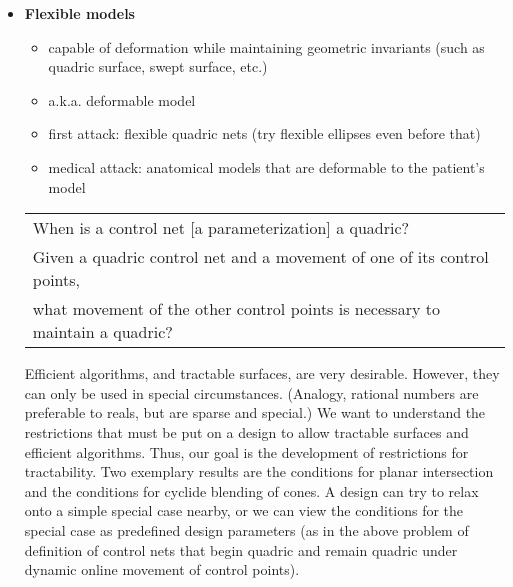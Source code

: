 \begin{itemize}
\clearpage

\item
{\bf Flexible models}
\begin{itemize}
\item capable of deformation while maintaining geometric invariants
	(such as quadric surface, swept surface, etc.)
\item a.k.a. deformable model 
\item first attack: flexible quadric nets (try flexible ellipses even
	before that) %
\item medical attack: anatomical models that are deformable to the 
	patient's model
\end{itemize}

\begin{table}[h]
\centering
\begin{tabular}{|l|}
%
\hline
When is a control net [a parameterization] a quadric?  \\
Given a quadric control net and a movement of one of its control points, \\
what movement of the other control points is necessary to maintain a
quadric? \\
% 
\hline
\end{tabular}
\end{table}

Efficient algorithms, and tractable surfaces, are very desirable.
However, they can only be used in special circumstances.
(Analogy, rational numbers are preferable to reals, but are sparse
and special.)
We want to understand the restrictions that must be put on a design
to allow tractable surfaces and efficient algorithms.
Thus, our goal is the development of restrictions for tractability.
Two exemplary results are the conditions for planar intersection
and the conditions for cyclide blending of cones.
A design can try to relax onto a simple special case nearby,
or we can view the conditions for the special case as predefined design
parameters (as in the above problem of definition of control
nets that begin quadric and remain quadric under dynamic online
movement of control points).


\end{itemize}
